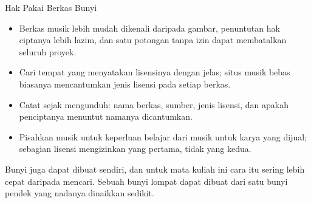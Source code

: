 \documentclass[aspectratio=169,10pt]{beamer}
\begin{document}
\begin{frame}{Hak Pakai Berkas Bunyi}
\begin{itemize}
  \item Berkas musik lebih mudah dikenali daripada gambar, penuntutan hak
        ciptanya lebih lazim, dan satu potongan tanpa izin dapat membatalkan
        seluruh proyek.
  \item Cari tempat yang menyatakan lisensinya dengan jelas; situs musik bebas
        biasanya mencantumkan jenis lisensi pada setiap berkas.
  \item Catat sejak mengunduh: nama berkas, sumber, jenis lisensi, dan apakah
        penciptanya menuntut namanya dicantumkan.
  \item Pisahkan musik untuk keperluan belajar dari musik untuk karya yang
        dijual; sebagian lisensi mengizinkan yang pertama, tidak yang kedua.
\end{itemize}
\vspace{0.16cm}
\begin{kiat}
Bunyi juga dapat dibuat sendiri, dan untuk mata kuliah ini cara itu sering lebih
cepat daripada mencari. Sebuah bunyi lompat dapat dibuat dari satu bunyi pendek
yang nadanya dinaikkan sedikit.
\end{kiat}
\end{frame}
\end{document}
